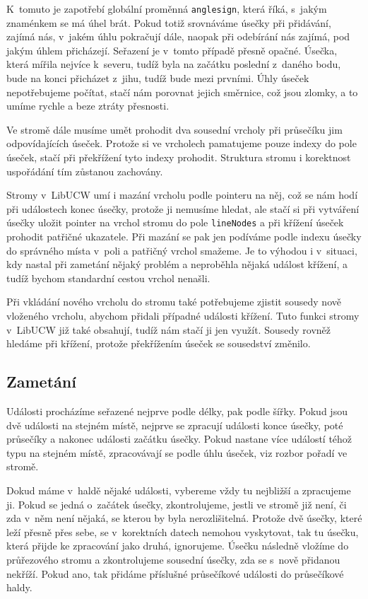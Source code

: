 K~tomuto je zapotřebí globální proměnná \verb|anglesign|, která říká, s~jakým
znaménkem se má úhel brát. Pokud totiž srovnáváme úsečky při přidávání, zajímá
nás, v~jakém úhlu pokračují dále, naopak při odebírání nás zajímá, pod jakým
úhlem přicházejí. Seřazení je v~tomto případě přesně opačné. Úsečka, která
mířila nejvíce k~severu, tudíž byla na začátku poslední z~daného bodu, bude na
konci přicházet z~jihu, tudíž bude mezi prvními. Úhly úseček nepotřebujeme
počítat, stačí nám porovnat jejich směrnice, což jsou zlomky, a to umíme rychle
a beze ztráty přesnosti.

Ve stromě dále musíme umět prohodit dva sousední vrcholy při průsečíku jim
odpovídajících úseček. Protože si ve vrcholech pamatujeme pouze indexy do pole
úseček, stačí při překřížení tyto indexy prohodit. Struktura stromu i korektnost
uspořádání tím zůstanou zachovány.

Stromy v~LibUCW umí i mazání vrcholu podle pointeru na něj, což se nám hodí při
událostech konec úsečky, protože ji nemusíme hledat, ale stačí si při vytváření
úsečky uložit pointer na vrchol stromu do pole \verb|lineNodes| a při křížení
úseček prohodit patřičné ukazatele. Při mazání se pak jen podíváme podle indexu
úsečky do správného místa v~poli a patřičný vrchol smažeme. Je to výhodou i
v~situaci, kdy nastal při zametání nějaký problém a neproběhla nějaká událost
křížení, a tudíž bychom standardní cestou vrchol nenašli.

Při vkládání nového vrcholu do stromu také potřebujeme zjistit sousedy nově
vloženého vrcholu, abychom přidali případné události křížení. Tuto funkci stromy
v~LibUCW již také obsahují, tudíž nám stačí ji jen využít. Sousedy rovněž
hledáme při křížení, protože překřížením úseček se sousedství změnilo.


\subsection{Zametání}
Události procházíme seřazené nejprve podle délky, pak podle šířky. Pokud jsou
dvě události na stejném místě, nejprve se zpracují události konce úsečky, poté
průsečíky a nakonec události začátku úsečky. Pokud nastane více událostí téhož
typu na stejném místě, zpracovávají se podle úhlu úseček, viz rozbor pořadí ve stromě. 

Dokud máme v~haldě nějaké události, vybereme vždy tu nejbližší a zpracujeme ji.
Pokud se jedná o~začátek úsečky, zkontrolujeme, jestli ve stromě již není, či
zda v~něm není nějaká, se kterou by byla nerozlišitelná. Protože dvě úsečky,
které leží přesně přes sebe, se v~korektních datech nemohou vyskytovat, tak tu 
úsečku, která přijde ke
zpracování jako druhá, ignorujeme. Úsečku následně vložíme do průřezového stromu
a zkontrolujeme sousední úsečky, zda se s~nově přidanou nekříží. Pokud ano, tak
přidáme příslušné průsečíkové události do průsečíkové haldy.

